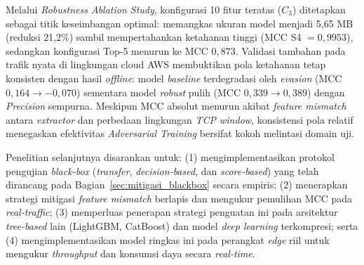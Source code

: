 \documentclass[10pt,twocolumn,a4paper]{extarticle}
\begin{document}
Melalui \textit{Robustness Ablation Study}, konfigurasi 10 fitur teratas ($C_3$) ditetapkan sebagai titik keseimbangan optimal: memangkas ukuran model menjadi 5,65 MB (reduksi 21,2\%) sambil mempertahankan ketahanan tinggi (MCC S4 $= 0{,}9953$), sedangkan konfigurasi Top-5 menurun ke MCC $0{,}873$. Validasi tambahan pada trafik nyata di lingkungan cloud AWS membuktikan pola ketahanan tetap konsisten dengan hasil \textit{offline}: model \textit{baseline} terdegradasi oleh \textit{evasion} (MCC $0{,}164 \rightarrow -0{,}070$) sementara model \textit{robust} pulih (MCC $0{,}339 \rightarrow 0{,}389$) dengan \textit{Precision} sempurna. Meskipun MCC absolut menurun akibat \textit{feature mismatch} antara \textit{extractor} dan perbedaan lingkungan \textit{TCP window}, konsistensi pola relatif menegaskan efektivitas \textit{Adversarial Training} bersifat kokoh melintasi domain uji.

Penelitian selanjutnya disarankan untuk: (1) mengimplementasikan protokol pengujian \textit{black-box} (\textit{transfer}, \textit{decision-based}, dan \textit{score-based}) yang telah dirancang pada Bagian~\ref{sec:mitigasi_blackbox} secara empiris; (2) menerapkan strategi mitigasi \textit{feature mismatch} berlapis dan mengukur pemulihan MCC pada \textit{real-traffic}; (3) memperluas penerapan strategi penguatan ini pada arsitektur \textit{tree-based} lain (LightGBM, CatBoost) dan model \textit{deep learning} terkompresi; serta (4) mengimplementasikan model ringkas ini pada perangkat \textit{edge} riil untuk mengukur \textit{throughput} dan konsumsi daya secara \textit{real-time}.
\end{document}

